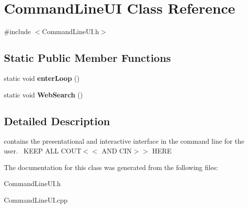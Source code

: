 \hypertarget{class_command_line_u_i}{}\section{Command\+Line\+UI Class Reference}
\label{class_command_line_u_i}


{\ttfamily \#include $<$Command\+Line\+U\+I.\+h$>$}

\subsection*{Static Public Member Functions}
\begin{DoxyCompactItemize}
\item 
\mbox{\label{class_command_line_u_i_ac72a09121b78bdf1ab1f457795fcf370}} 
static void {\bfseries enter\+Loop} ()
\item 
\mbox{\label{class_command_line_u_i_a839fd5285e6a956589e2a1895f5a8c1c}} 
static void {\bfseries Web\+Search} ()
\end{DoxyCompactItemize}


\subsection{Detailed Description}
contains the presentational and interactive interface in the command line for the user.~\newline
K\+E\+EP A\+LL C\+O\+UT$<$$<$ A\+ND C\+IN$>$$>$ H\+E\+RE 

The documentation for this class was generated from the following files\+:\begin{DoxyCompactItemize}
\item 
Command\+Line\+U\+I.\+h\item 
Command\+Line\+U\+I.\+cpp\end{DoxyCompactItemize}

